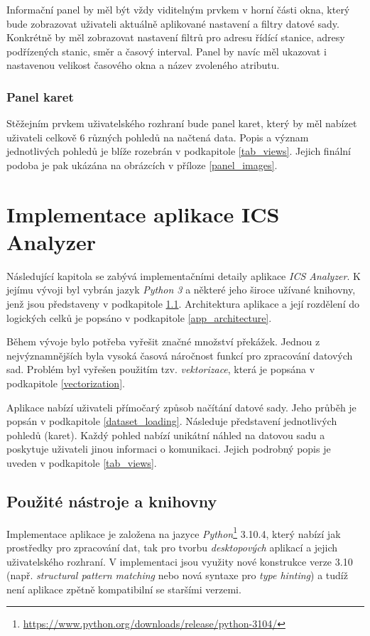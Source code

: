 Informační panel by měl být vždy viditelným prvkem v horní části okna, který bude zobrazovat uživateli aktuálně aplikované nastavení a filtry datové sady. Konkrétně by měl zobrazovat nastavení filtrů pro adresu řídící stanice, adresy podřízených stanic, směr a časový interval. Panel by navíc měl ukazovat i nastavenou velikost časového okna a název zvoleného atributu.

\subsection*{Panel karet}

Stěžejním prvkem uživatelského rozhraní bude panel karet, který by měl nabízet uživateli celkově 6 různých pohledů na načtená data. Popis a význam jednotlivých pohledů je blíže rozebrán v podkapitole \ref{tab_views}. Jejich finální podoba je pak ukázána na obrázcích v příloze \ref{panel_images}.


\chapter{Implementace aplikace ICS Analyzer}
\label{chapter_implementation}

Následující kapitola se zabývá implementačními detaily aplikace \emph{ICS Analyzer}. K jejímu vývoji byl vybrán jazyk \emph{Python 3} a některé jeho široce užívané knihovny, jenž jsou představeny v podkapitole \ref{tools_and_libs}. Architektura aplikace a její rozdělení do logických celků je popsáno v podkapitole \ref{app_architecture}.

Během vývoje bylo potřeba vyřešit značné množství překážek. Jednou z nejvýznamnějších byla vysoká časová náročnost funkcí pro zpracování datových sad. Problém byl vyřešen použitím tzv. \emph{vektorizace}, která je popsána v podkapitole \ref{vectorization}.

Aplikace nabízí uživateli přímočarý způsob načítání datové sady. Jeho průběh je popsán v podkapitole \ref{dataset_loading}. Následuje představení jednotlivých pohledů (karet). Každý pohled nabízí unikátní náhled na datovou sadu a poskytuje uživateli jinou informaci o komunikaci. Jejich podrobný popis je uveden v podkapitole \ref{tab_views}.


\section{Použité nástroje a knihovny}
\label{tools_and_libs}

Implementace aplikace je založena na jazyce \emph{Python}\footnote{\url{https://www.python.org/downloads/release/python-3104/}} 3.10.4, který nabízí jak prostředky pro zpracování dat, tak pro tvorbu \emph{desktopových} aplikací a jejich uživatelského rozhraní. V implementaci jsou využity nové konstrukce verze 3.10 (např. \emph{structural pattern matching} nebo nová syntaxe pro \emph{type hinting}) a tudíž není aplikace zpětně kompatibilní se staršími verzemi.

